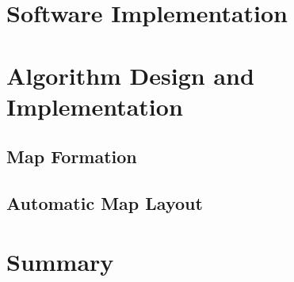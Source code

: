 \section{Software Implementation}

\section{Algorithm Design and Implementation}

\subsection{Map Formation}

\subsection{Automatic Map Layout}

\section{Summary}